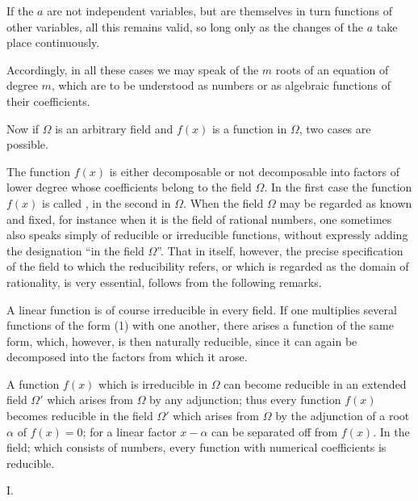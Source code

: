 
If the $a$ are not independent variables, but are themselves in turn functions of other variables, all this remains valid, so long only as the changes of the $a$ take place continuously.

Accordingly, in all these cases we may speak of the $m$ roots of an equation of degree $m$, which are to be understood as numbers or as algebraic functions of their coefficients.

Now if $\Omega$ is an arbitrary field and $f(x)$ is a function in $\Omega$, two cases are possible.

The function $f(x)$ is either decomposable or not decomposable into factors of lower degree whose coefficients belong to the field $\Omega$. In the first case the function $f(x)$ is called , in the second  in $\Omega$. When the field $\Omega$ may be regarded as known and fixed, for instance when it is the field of rational numbers, one sometimes also speaks simply of reducible or irreducible functions, without expressly adding the designation ``in the field $\Omega$''. That in itself, however, the precise specification of the field to which the reducibility refers, or which is regarded as the domain of rationality, is very essential, follows from the following remarks.

A linear function is of course irreducible in every field. If one multiplies several functions of the form (1) with one another, there arises a function of the same form, which, however, is then naturally reducible, since it can again be decomposed into the factors from which it arose.

A function $f(x)$ which is irreducible in $\Omega$ can become reducible in an extended field $\Omega'$ which arises from $\Omega$ by any adjunction; thus every function $f(x)$ becomes reducible in the field $\Omega'$ which arises from $\Omega$ by the adjunction of a root $\alpha$ of $f(x) = 0$; for a linear factor $x - \alpha$ can be separated off from $f(x)$. In the field; which consists of  numbers, every function with numerical coefficients is reducible. %

I. 
